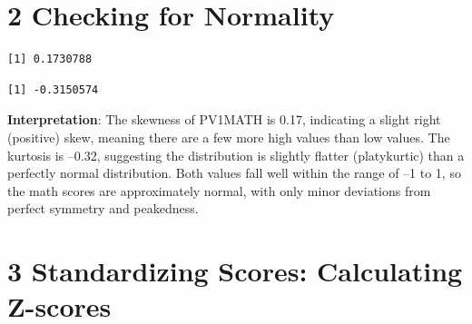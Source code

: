 \documentclass[
  letterpaper,
  DIV=11,
  numbers=noendperiod]{scrreprt}
\newenvironment{Shaded}{\begin{snugshade}}{\end{snugshade}}
\newcommand{\AttributeTok}[1]{\textcolor[rgb]{0.40,0.45,0.13}{#1}}
\newcommand{\CommentTok}[1]{\textcolor[rgb]{0.37,0.37,0.37}{#1}}
\newcommand{\ConstantTok}[1]{\textcolor[rgb]{0.56,0.35,0.01}{#1}}
\newcommand{\FunctionTok}[1]{\textcolor[rgb]{0.28,0.35,0.67}{#1}}
\newcommand{\NormalTok}[1]{\textcolor[rgb]{0.00,0.23,0.31}{#1}}
\newcommand{\OtherTok}[1]{\textcolor[rgb]{0.00,0.23,0.31}{#1}}
\newcommand{\SpecialCharTok}[1]{\textcolor[rgb]{0.37,0.37,0.37}{#1}}
\begin{document}
\section*{2 Checking for Normality}\label{checking-for-normality}


\begin{Shaded}
\end{Shaded}

\begin{verbatim}
[1] 0.1730788
\end{verbatim}

\begin{Shaded}
\end{Shaded}

\begin{verbatim}
[1] -0.3150574
\end{verbatim}

\textbf{Interpretation}: The skewness of PV1MATH is 0.17, indicating a
slight right (positive) skew, meaning there are a few more high values
than low values. The kurtosis is --0.32, suggesting the distribution is
slightly flatter (platykurtic) than a perfectly normal distribution.
Both values fall well within the range of --1 to 1, so the math scores
are approximately normal, with only minor deviations from perfect
symmetry and peakedness.

\section*{3 Standardizing Scores: Calculating
Z-scores}\label{standardizing-scores-calculating-z-scores}


\begin{Shaded}
\end{Shaded}
\end{document}
